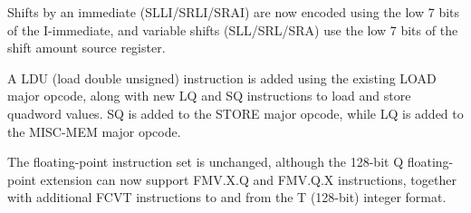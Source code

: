 Shifts by an immediate (SLLI/SRLI/SRAI) are now encoded using the low
7 bits of the I-immediate, and variable shifts (SLL/SRL/SRA) use the
low 7 bits of the shift amount source register.

A LDU (load double unsigned) instruction is added using the existing
LOAD major opcode, along with new LQ and SQ instructions to load and
store quadword values.  SQ is added to the STORE major opcode, while
LQ is added to the MISC-MEM major opcode.

The floating-point instruction set is unchanged, although the 128-bit
Q floating-point extension can now support FMV.X.Q and FMV.Q.X
instructions, together with additional FCVT instructions to and from
the T (128-bit) integer format.


